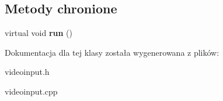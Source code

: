 \subsection*{Metody chronione}
\begin{DoxyCompactItemize}
\item 
\hypertarget{class_video_input_a653a4568756629a94a3b6e2697973864}{
virtual void {\bfseries run} ()}
\label{class_video_input_a653a4568756629a94a3b6e2697973864}

\end{DoxyCompactItemize}


Dokumentacja dla tej klasy została wygenerowana z plików:\begin{DoxyCompactItemize}
\item 
videoinput.h\item 
videoinput.cpp\end{DoxyCompactItemize}
